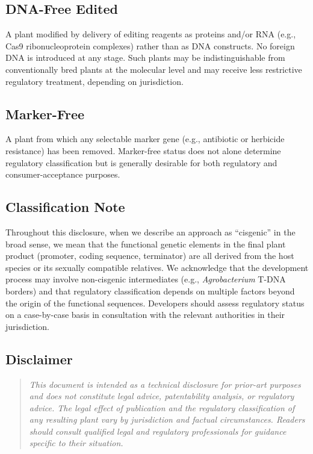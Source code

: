 \documentclass[12pt,a4paper]{article}
\begin{document}
\subsection{DNA-Free Edited}
A plant modified by delivery of editing reagents as proteins and/or RNA (e.g., Cas9 ribonucleoprotein complexes) rather than as DNA constructs. No foreign DNA is introduced at any stage. Such plants may be indistinguishable from conventionally bred plants at the molecular level and may receive less restrictive regulatory treatment, depending on jurisdiction.

\subsection{Marker-Free}
A plant from which any selectable marker gene (e.g., antibiotic or herbicide resistance) has been removed. Marker-free status does not alone determine regulatory classification but is generally desirable for both regulatory and consumer-acceptance purposes.

\subsection{Classification Note}
Throughout this disclosure, when we describe an approach as ``cisgenic'' in the broad sense, we mean that the functional genetic elements in the final plant product (promoter, coding sequence, terminator) are all derived from the host species or its sexually compatible relatives. We acknowledge that the development process may involve non-cisgenic intermediates (e.g., \textit{Agrobacterium} T-DNA borders) and that regulatory classification depends on multiple factors beyond the origin of the functional sequences. Developers should assess regulatory status on a case-by-case basis in consultation with the relevant authorities in their jurisdiction.

\subsection{Disclaimer}
\label{sec:disclaimer}
\begin{quote}
\textit{This document is intended as a technical disclosure for prior-art purposes and does not constitute legal advice, patentability analysis, or regulatory advice. The legal effect of publication and the regulatory classification of any resulting plant vary by jurisdiction and factual circumstances. Readers should consult qualified legal and regulatory professionals for guidance specific to their situation.}
\end{quote}
\end{document}
